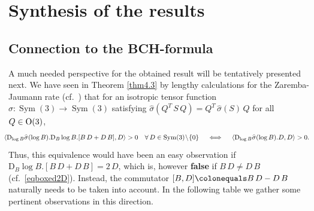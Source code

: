 \documentclass[10pt]{article}
\numberwithin{theoremCounter}{section}
\theoremstyle{plain}
\theoremstyle{definition}
\newcommand{\OO}{{\rm O}}
\newcommand{\DD}{\mathrm{D}}
\DeclareMathOperator{\Sym}{Sym}
\numberwithin{equation}{section}
\begin{document}
\section{Synthesis of the results} \label{sec6}
%
\subsection{Connection to the BCH-formula}
%
A much needed perspective for the obtained result will be tentatively presented next. We have seen in Theorem \ref{thm4.3} by lengthy calculations for the Zaremba-Jaumann rate (cf.~\cite{tobedone}) that for an isotropic tensor function \break $\widehat \sigma\colon \Sym(3) \to \Sym(3)$ satisfying $\widehat \sigma(Q^T \, S \, Q) = Q^T \, \widehat \sigma(S) \, Q$ for all $Q \in \OO(3)$,
	\begin{align}
	\hspace*{-8pt} \langle \DD_{\log B} \widehat \sigma(\log B) . \DD_B \log B . [B \, D + D \, B], D \rangle > 0 \quad \forall \, D \in \Sym(3) \! \setminus \! \{0\} \quad \iff \quad \langle \DD_{\log B} \widehat \sigma(\log B). D, D \rangle > 0.
	\end{align}
Thus, this equivalence would have been an easy observation if $\DD_B \log B.[B \, D + D \, B] = 2 \, D$, which is, however \textbf{false} if $B \, D \neq D \, B$ (cf.~\eqref{eqboxed2D}). Instead, the commutator $[B, D] \colonequals B \, D - D \, B$ naturally needs to be taken into account. In the following table we gather some pertinent observations in this direction. \\
\end{document}
